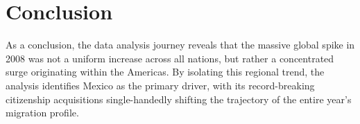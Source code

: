 \documentclass[12pt,letterpaper]{article}
\begin{document}
\section{Conclusion}
As a conclusion, the data analysis journey reveals that the massive global spike in 2008 was not a uniform increase across all nations, but rather a concentrated surge originating within the Americas. By isolating this regional trend, the analysis identifies Mexico as the primary driver, with its record-breaking citizenship acquisitions single-handedly shifting the trajectory of the entire year's migration profile.
\end{document}
